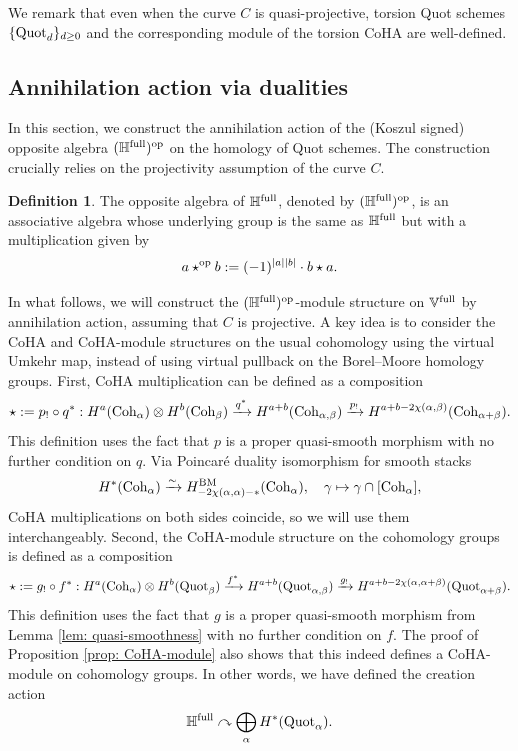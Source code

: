 \documentclass[10pt]{amsart}
\newcommand{\BH}{\mathbb{H}}
\newcommand{\BV}{\mathbb{V}}
\newcommand{\Quot}{\textnormal{Quot}}
\newcommand{\Coh}{\textnormal{Coh}}
\newcommand{\BM}{\textnormal{BM}}
\newcommand{\op}{\textnormal{op}}
\newcommand{\+}{{}^+}
\newcommand{\full}{\textnormal{full}}
\theoremstyle{definition}
\theoremstyle {definition}
\theoremstyle {definition}
\newtheorem{definition}[theorem]{Definition}
\begin{document}
We remark that even when the curve $C$ is quasi-projective, torsion Quot schemes $\{\Quot_{d}\}_{d\geq 0}$ and the corresponding module of the torsion CoHA are well-defined.


\subsection{Annihilation action via dualities}\label{sec: annihilation}


In this section, we construct the annihilation action of the (Koszul signed) opposite algebra $(\BH^\full)^\op$ on the homology of Quot schemes. The construction crucially relies on the projectivity assumption of the curve $C$. 

\begin{definition}\label{def: Koszul signed opposite algebra}
    The opposite algebra of $\BH^\full$, denoted by $(\BH^\full)^\op$, is an associative algebra whose underlying group is the same as $\BH^\full$ but with a multiplication given by 
    $$a\star^{\op}b:=(-1)^{|a||b|}\cdot b\star a. 
    $$
\end{definition}

In what follows, we will construct the $(\BH^\full)^\op$-module structure on $\BV^\full$ by annihilation action, assuming that $C$ is projective. A key idea is to consider the CoHA and CoHA-module structures on the usual cohomology using the virtual Umkehr map, instead of using virtual pullback on the Borel--Moore homology groups. First, CoHA multiplication can be defined as a composition
$$\star:=p_!\circ q^*:H^a(\Coh_\alpha)\otimes H^b(\Coh_\beta)\xrightarrow{q^*}H^{a+b}(\Coh_{\alpha,\beta})\xrightarrow{p_!} H^{a+b-2\chi(\alpha,\beta)}(\Coh_{\alpha+\beta}). 
$$
This definition uses the fact that $p$ is a proper quasi-smooth morphism with no further condition on $q$. Via Poincar\'e duality isomorphism for smooth stacks
$$H^*(\Coh_\alpha)\xrightarrow{\sim}H^\BM_{-2\chi(\alpha,\alpha)-*}(\Coh_\alpha),\quad \gamma\mapsto \gamma\cap [\Coh_\alpha],
$$
CoHA multiplications on both sides coincide, so we will use them interchangeably. Second, the CoHA-module structure on the cohomology groups is defined as a composition
$$\star:=g_!\circ f^*:H^a(\Coh_\alpha)\otimes H^b(\Quot_\beta)\xrightarrow{f^*}H^{a+b}(\Quot_{\alpha,\beta})\xrightarrow{g_!} H^{a+b-2\chi(\alpha,\alpha+\beta)}(\Quot_{\alpha+\beta}). 
$$
This definition uses the fact that $g$ is a proper quasi-smooth morphism from Lemma \ref{lem: quasi-smoothness} with no further condition on $f$. The proof of Proposition \ref{prop: CoHA-module} also shows that this indeed defines a CoHA-module on cohomology groups. In other words, we have defined the creation action 
\begin{equation}\label{eq: creation on cohomology}
    \BH^\full\curvearrowright\bigoplus_\alpha H^*(\Quot_\alpha). 
\end{equation}
\end{document}
